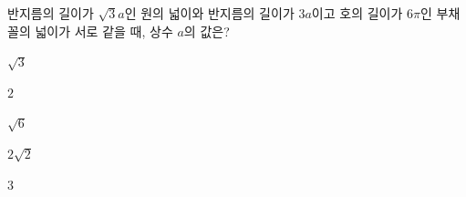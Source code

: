 반지름의 길이가 $\sqrt{3}a$인 원의 넓이와 반지름의 길이가 $3a$이고 호의 길이가 $6\pi$인 부채꼴의 넓이가 서로 같을 때, 상수 $a$의 값은?
\begin{choices32}{\rule[-3ex]{0pt}{8ex}$\sqrt{3}$}{\rule[-3ex]{0pt}{8ex}$2$}{\rule[-3ex]{0pt}{8ex}$\sqrt{6}$}{\rule[-3ex]{0pt}{8ex}$2\sqrt{2}$}{\rule[-3ex]{0pt}{8ex}$3$}\end{choices32}
